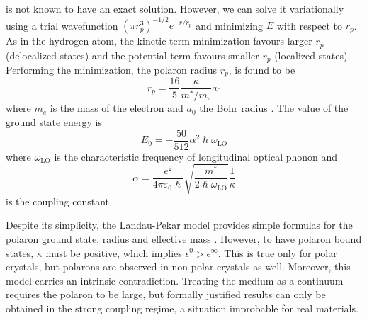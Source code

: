  is not known to have an exact solution. However, we can solve it variationally using a trial wavefunction $(\pi r_p^3)^{-1/2} e^{-r/r_p}$ and minimizing $E$ with respect to $r_p$. As in the hydrogen atom, the kinetic term minimization favours larger $r_p$ (delocalized states) and the potential term favours smaller $r_p$ (localized states). Performing the minimization, the polaron radius $r_p$, is found to be
\begin{equation}
    r_p = \frac{16}{5} \frac{\kappa}{m^*/m_e} a_0
\end{equation}
where $m_e$ is the mass of the electron and $a_0$ the Bohr radius \cite{alexandrov2010}. The value of the ground state energy is
\begin{equation}
    E_0 = -\frac{50}{512} \alpha^2 \hslash \omega_\text{LO}
\end{equation}
where $\omega_\text{LO}$ is the characteristic frequency of longitudinal optical phonon and
\begin{equation}
    \alpha = \frac{e^2}{4\pi\varepsilon_0\hslash} \sqrt{\frac{m^*}{2\hslash\omega_\text{LO}}} \frac{1}{\kappa}
\end{equation}
is the coupling constant

Despite its simplicity, the Landau-Pekar model provides simple formulas for the polaron ground state, radius and effective mass \cite{landau1948}. However, to have polaron bound states, $\kappa$ must be positive, which implies $\epsilon^0 > \epsilon^\infty$. This is true only for polar crystals, but polarons are observed in non-polar crystals as well. Moreover, this model carries an intrinsic contradiction. Treating the medium as a continuum requires the polaron to be large, but formally justified results can only be obtained in the strong coupling regime, a situation improbable for real materials.